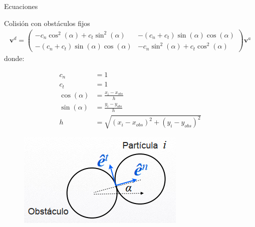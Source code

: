 \begin{frame}{Ecuaciones}
    \begin{block}{Colisión con obstáculos fijos}
        \begin{equation}
            \begin{aligned}
                \mathbf{v}^{d} = \begin{pmatrix} -c_n \cos^{2}(\alpha) + c_t \sin^{2}(\alpha) & - (c_n + c_t) \sin(\alpha) \cos(\alpha) \\
                - (c_n + c_t) \sin(\alpha) \cos(\alpha) & -c_n \sin^{2}(\alpha) + c_t \cos^{2}(\alpha) \end{pmatrix} \mathbf{v}^{a}
            \end{aligned}\label{eq:equation-particles-collision-obstacle}
        \end{equation}
        donde:
        \begin{minipage}[t]{0.7\linewidth}
            \begin{equation}
                \begin{aligned}
                    c_n &= 1 \\
                    c_t &= 1 \\
                    \cos(\alpha) &= \frac{x_i - x_{obs}}{h} \\
                    \sin(\alpha) &= \frac{y_i - y_{obs}}{h} \\
                    h &= \sqrt{(x_i - x_{obs})^2 + (y_i - y_{obs})^2}
                \end{aligned}\label{eq:equation-particles-collision-obstacle-variables}
            \end{equation}
        \end{minipage}
        \hfill
        \begin{minipage}[t]{0.2\linewidth}
            \begin{figure}[H]
                \centering
                \includegraphics[width=0.7\linewidth]{pic/01-intro/obstacle-collision-diagram}\label{fig:figure-obstacle-collision-diagram}
            \end{figure}
        \end{minipage}
    \end{block}

\end{frame}
